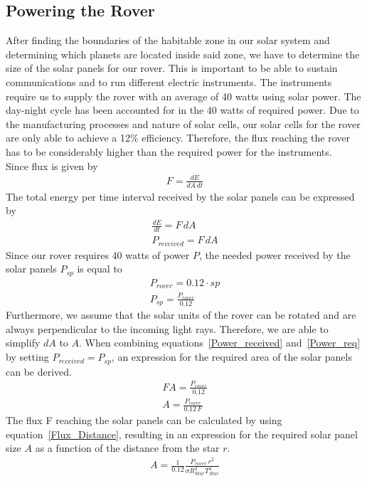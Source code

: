 \documentclass[reprint,english,notitlepage]{revtex4-2}
\begin{document}
\subsection{Powering the Rover}\label{subsec:powering-the-rover}
After finding the boundaries of the habitable zone in our solar system and determining which planets are located inside said zone, we have to determine the size of the solar panels for our rover.
This is important to be able to sustain communications and to run different electric instruments.
The instruments require us to supply the rover with an average of 40 watts using solar power.
The day-night cycle has been accounted for in the 40 watts of required power.
Due to the manufacturing processes and nature of solar cells, our solar cells for the rover are only able to achieve a 12\% efficiency.
Therefore, the flux reaching the rover has to be considerably higher than the required power for the instruments.\\
Since flux is given by 
\begin{align*}
    F = \frac{dE}{dA\,dt}
\end{align*}
The total energy per time interval received by the solar panels can be expressed by
\begin{align}
    \frac{dE}{dt} = F\,dA \\
	P_{received} = F\,dA \label{Power_received}
\end{align}
Since our rover requires 40 watts of power $P$, the needed power received by the solar panels $P_{sp}$ is equal to
\begin{align}
    P_{rover} = 0.12 \cdot {sp} \\
	P_{sp} = \frac{P_{rover}}{0.12} \label{Power_req}
\end{align}
Furthermore, we assume that the solar units of the rover can be rotated and are always perpendicular to the incoming light rays.
Therefore, we are able to simplify $dA$ to $A$.
When combining equations~\eqref{Power_received} and~\eqref{Power_req} by setting $P_{received} = P_{sp}$, an expression for the required area of the solar panels can be derived.
\begin{align*}
    F A = \frac{P_{rover}}{0.12}\\
	A = \frac{P_{rover}}{0.12\,F}
\end{align*}
The flux F reaching the solar panels can be calculated by using equation~\eqref{Flux_Distance}, resulting in an expression for the required solar panel size $A$ as a function of the distance from the star $r$.
\begin{align*}
    A = \frac{1}{0.12}\frac{P_{rover}\,r^2}{\sigma R_{Star}^2 T_{Star}^4}
\end{align*}
\end{document}
